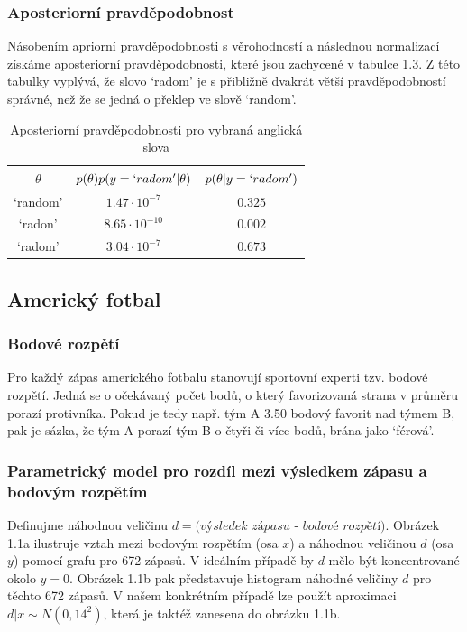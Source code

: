 \subsubsection{Aposteriorní pravděpodobnost}

Násobením apriorní pravděpodobnosti s věrohodností a následnou normalizací získáme aposteriorní pravděpodobnosti, které jsou zachycené v tabulce 1.3. Z této tabulky vyplývá, že slovo `radom' je s přibližně dvakrát větší pravděpodobností správné, než že se jedná o překlep ve slově `random'.

\begin{table}
\begin{center}
\begin{tabular}{c c c}
$\theta$ & $p(\theta)p(y = `radom' | \theta)$ & $p(\theta | y = `radom')$\\
\hline
`random' & $1.47 \cdot 10^{-7}$ & $0.325$\\
`radon' & $8.65 \cdot 10^{-10}$ & $0.002$\\ 
`radom' & $3.04 \cdot 10^{-7}$ & $0.673$\\
\end{tabular}
\caption{Aposteriorní pravděpodobnosti pro vybraná anglická slova}
\end{center}
\end{table}

\subsection{Americký fotbal}

\subsubsection{Bodové rozpětí}

Pro každý zápas amerického fotbalu stanovují sportovní experti tzv. bodové rozpětí. Jedná se o očekávaný počet bodů, o který favorizovaná strana v průměru porazí protivníka. Pokud je tedy např. tým A 3.50 bodový favorit nad týmem B, pak je sázka, že tým A porazí tým B o čtyři či více bodů, brána jako `férová'.

\subsubsection{Parametrický model pro rozdíl mezi výsledkem zápasu a bodovým rozpětím}

Definujme náhodnou veličinu $d = \textit{(výsledek zápasu - bodové rozpětí)}$. Obrázek 1.1a ilustruje vztah mezi bodovým rozpětím (osa $x$) a náhodnou veličinou $d$ (osa $y$) pomocí grafu pro 672 zápasů. V ideálním případě by $d$ mělo být koncentrované okolo $y = 0$. Obrázek 1.1b pak představuje histogram náhodné veličiny $d$ pro těchto 672 zápasů. V našem konkrétním případě lze použít aproximaci $d|x \sim N(0, 14^2)$, která je taktéž zanesena do obrázku 1.1b.

